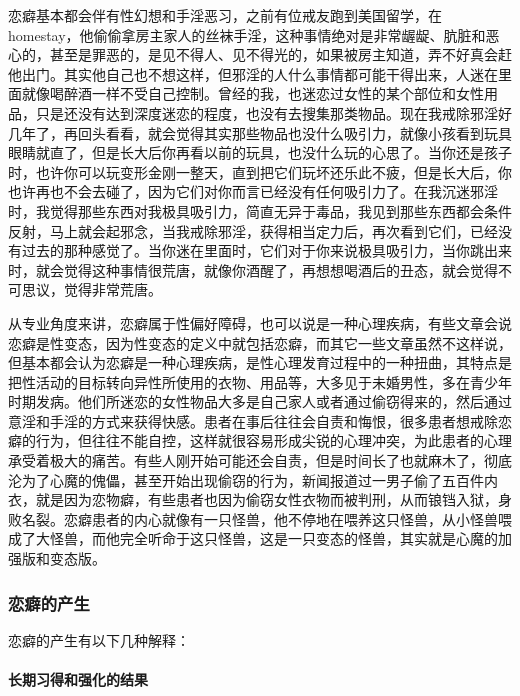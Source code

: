 恋癖基本都会伴有性幻想和手淫恶习，之前有位戒友跑到美国留学，在 homestay，他偷偷拿房主家人的丝袜手淫，这种事情绝对是非常龌龊、肮脏和恶心的，甚至是罪恶的，是见不得人、见不得光的，如果被房主知道，弄不好真会赶他出门。其实他自己也不想这样，但邪淫的人什么事情都可能干得出来，人迷在里面就像喝醉酒一样不受自己控制。曾经的我，也迷恋过女性的某个部位和女性用品，只是还没有达到深度迷恋的程度，也没有去搜集那类物品。现在我戒除邪淫好几年了，再回头看看，就会觉得其实那些物品也没什么吸引力，就像小孩看到玩具眼睛就直了，但是长大后你再看以前的玩具，也没什么玩的心思了。当你还是孩子时，也许你可以玩变形金刚一整天，直到把它们玩坏还乐此不疲，但是长大后，你也许再也不会去碰了，因为它们对你而言已经没有任何吸引力了。在我沉迷邪淫时，我觉得那些东西对我极具吸引力，简直无异于毒品，我见到那些东西都会条件反射，马上就会起邪念，当我戒除邪淫，获得相当定力后，再次看到它们，已经没有过去的那种感觉了。当你迷在里面时，它们对于你来说极具吸引力，当你跳出来时，就会觉得这种事情很荒唐，就像你酒醒了，再想想喝酒后的丑态，就会觉得不可思议，觉得非常荒唐。

从专业角度来讲，恋癖属于性偏好障碍，也可以说是一种心理疾病，有些文章会说恋癖是性变态，因为性变态的定义中就包括恋癖，而其它一些文章虽然不这样说，但基本都会认为恋癖是一种心理疾病，是性心理发育过程中的一种扭曲，其特点是把性活动的目标转向异性所使用的衣物、用品等，大多见于未婚男性，多在青少年时期发病。他们所迷恋的女性物品大多是自己家人或者通过偷窃得来的，然后通过意淫和手淫的方式来获得快感。患者在事后往往会自责和悔恨，很多患者想戒除恋癖的行为，但往往不能自控，这样就很容易形成尖锐的心理冲突，为此患者的心理承受着极大的痛苦。有些人刚开始可能还会自责，但是时间长了也就麻木了，彻底沦为了心魔的傀儡，甚至开始出现偷窃的行为，新闻报道过一男子偷了五百件内衣，就是因为恋物癖，有些患者也因为偷窃女性衣物而被判刑，从而锒铛入狱，身败名裂。恋癖患者的内心就像有一只怪兽，他不停地在喂养这只怪兽，从小怪兽喂成了大怪兽，而他完全听命于这只怪兽，这是一只变态的怪兽，其实就是心魔的加强版和变态版。

\subsubsection{恋癖的产生}

恋癖的产生有以下几种解释：

\paragraph{长期习得和强化的结果}

